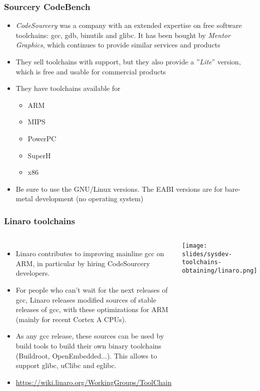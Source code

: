 \begin{frame}
  \frametitle{Sourcery CodeBench}
  \begin{itemize}
  \item {\em CodeSourcery} was a company with an extended expertise
    on free software toolchains: gcc, gdb, binutils and glibc. It has
    been bought by {\em Mentor Graphics}, which continues to provide
    similar services and products
  \item They sell toolchains with support, but they also provide a
    ”{\em Lite}” version, which is free and usable for commercial
    products
  \item They have toolchains available for
    \begin{itemize}
    \item ARM
    \item MIPS
    \item PowerPC
    \item SuperH
    \item x86
    \end{itemize}
  \item Be sure to use the GNU/Linux versions. The EABI versions are
    for bare-metal development (no operating system)
  \end{itemize}
\end{frame}

\begin{frame}
  \frametitle{Linaro toolchains}
  \begin{columns}
    \begin{itemize}
    \item Linaro contributes to improving mainline gcc on ARM, in
      particular by hiring CodeSourcery developers.
    \item For people who can't wait for the next releases of gcc, Linaro
      releases modified sources of stable releases of gcc, with these
      optimizations for ARM (mainly for recent Cortex A CPUs).
    \item As any gcc release, these sources can be used by build tools
      to build their own binary toolchains (Buildroot, OpenEmbedded...).
      This allows to support glibc, uClibc and eglibc.
    \item \small\url{https://wiki.linaro.org/WorkingGroups/ToolChain}\normalsize
    \end{itemize}
    \texttt{[image: slides/sysdev-toolchains-obtaining/linaro.png]}
  \end{columns}
\end{frame}

